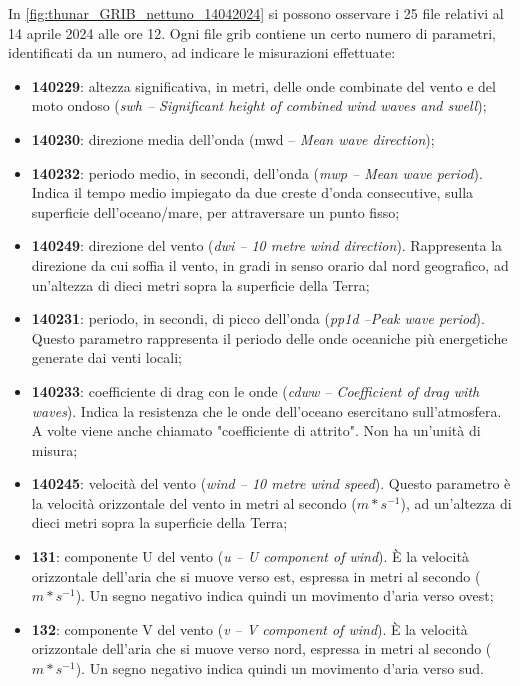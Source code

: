 \documentclass[./main.tex]{subfiles}
\begin{document}
In \autoref{fig:thunar_GRIB_nettuno_14042024} si possono osservare i 25 file relativi al 14 aprile 2024 alle ore 12. Ogni file grib contiene un certo numero di parametri, identificati da un numero, ad indicare le misurazioni effettuate:
\begin{itemize}
    \item \textbf{140229}: altezza significativa, in metri, delle onde combinate del vento e del moto ondoso (\textit{swh -- Significant height of combined wind waves and swell});
    \item \textbf{140230}: direzione media dell'onda (mwd -- \textit{Mean wave direction});
    \item \textbf{140232}: periodo medio, in secondi, dell'onda (\textit{mwp -- Mean wave period}). Indica il tempo medio impiegato da due creste d'onda consecutive, sulla superficie dell'oceano/mare, per attraversare un punto fisso;
    \item \textbf{140249}: direzione del vento (\textit{dwi -- 10 metre wind direction}). Rappresenta la direzione da cui soffia il vento, in gradi in senso orario dal nord geografico, ad un'altezza di dieci metri sopra la superficie della Terra;
    \item \textbf{140231}: periodo, in secondi, di picco dell'onda (\textit{pp1d --Peak wave period}). Questo parametro rappresenta il periodo delle onde oceaniche più energetiche generate dai venti locali;
    \item \textbf{140233}: coefficiente di drag con le onde (\textit{cdww -- Coefficient of drag with waves}). Indica la resistenza che le onde dell'oceano esercitano sull'atmosfera.  A volte viene anche chiamato "coefficiente di attrito". Non ha un'unità di misura;
    \item \textbf{140245}: velocità del vento (\textit{wind -- 10 metre wind speed}). Questo parametro è la velocità orizzontale del vento in metri al secondo ($m*s^{-1}$), ad un'altezza di dieci metri sopra la superficie della Terra;
    \item \textbf{131}: componente U del vento (\textit{u -- U component of wind}). È la velocità orizzontale dell'aria che si muove verso est, espressa in metri al secondo ($m*s^{-1}$).  Un segno negativo indica quindi un movimento d'aria verso ovest;
    \item \textbf{132}: componente V del vento (\textit{v -- V component of wind}). È la velocità orizzontale dell'aria che si muove verso nord, espressa in metri al secondo ($m*s^{-1}$).  Un segno negativo indica quindi un movimento d'aria verso sud.
\end{itemize}
\end{document}
